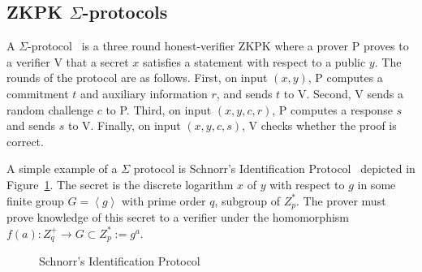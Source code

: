 

\subsection{ZKPK $\Sigma$-protocols}

A $\Sigma$-protocol~\cite{DamgardSigma2004} is a three round honest-verifier ZKPK where a prover P proves to a verifier V that a secret $x$ satisfies a statement with respect to a public $y$.  The rounds of the protocol are as follows. First, on input $(x,y)$, P computes a commitment $t$ and auxiliary information $r$, and sends $t$ to V. Second, V sends a random challenge $c$ to P. Third, on input $(x,y,c,r)$, P computes a response $s$ and sends $s$ to V. Finally, on input $(x,y,c,s)$, V checks whether the proof is correct. 

A simple example of a $\Sigma$ protocol is Schnorr's Identification
Protocol~\cite{schnorr_protocol} depicted in Figure~\ref{fig:schnorr_steps}. The
secret is the discrete logarithm $x$ of $y$ with respect to $g$ in some
finite group $G = \left< g \right>$ with prime order $q$, subgroup of
$Z_p^*$. The prover must prove knowledge of this secret to a verifier under
the homomorphism $f(a) : Z_q^+ \rightarrow G \subset Z_p^* := g^a$.
\begin{figure}[hbt!]
  \centering
  \caption{Schnorr's Identification Protocol}
  \label{fig:schnorr_steps}
\end{figure}


